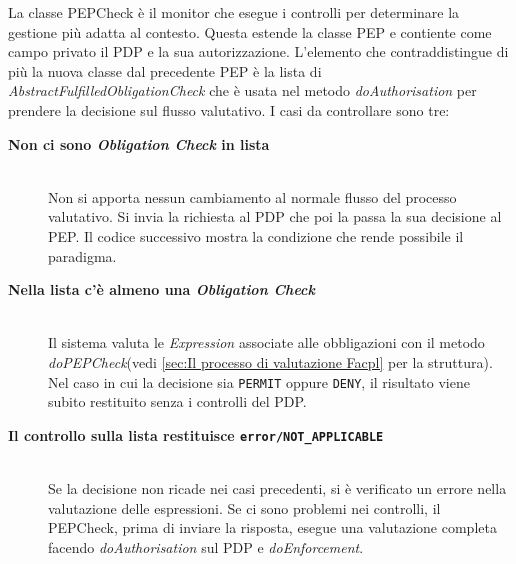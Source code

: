 La classe PEPCheck è il monitor che esegue i controlli per determinare la gestione più adatta al contesto.
Questa estende la classe \ac{PEP} e contiente come campo privato il \ac{PDP} e la sua autorizzazione.
L'elemento che contraddistingue di più la nuova classe dal precedente \ac{PEP} è la lista di
\emph{AbstractFulfilledObligationCheck} che è usata nel metodo \emph{doAuthorisation}
per prendere la decisione sul flusso valutativo. I casi da controllare sono tre:
\begin{description}

  \item[\normalfont\bfseries{\MakeUppercase{N}on ci sono \emph{Obligation Check} in lista}]
  {
  \hfill \\
  Non si apporta nessun cambiamento al normale flusso del processo valutativo.
  Si invia la richiesta al PDP che poi la passa la sua decisione al PEP.
  Il codice successivo mostra la condizione che rende possibile il paradigma.
  }

  \item[\normalfont\bfseries{\MakeUppercase{N}ella lista c'è almeno una \emph{Obligation Check}}]
  {
  \hfill \\
  Il sistema valuta le \emph{Expression} associate alle obbligazioni con il metodo
  \emph{doPEPCheck}(vedi \ref{sec:Il processo di valutazione Facpl}
  per la struttura). Nel caso in cui la decisione sia \texttt{PERMIT} oppure \texttt{DENY},
  il risultato viene subito restituito senza i controlli del PDP.
  }

  \item[\normalfont\bfseries{\MakeUppercase{I}l controllo sulla lista restituisce \texttt{error/\MakeUppercase{NOT\_APPLICABLE}}}]
  {
  \hfill \\
  Se la decisione non ricade nei casi precedenti,
  si è verificato un errore nella valutazione delle espressioni. Se ci sono problemi nei controlli, il PEPCheck, prima di
  inviare la risposta, esegue una valutazione completa facendo \emph{doAuthorisation} sul \ac{PDP} e \emph{doEnforcement}.
  }

\end{description}

